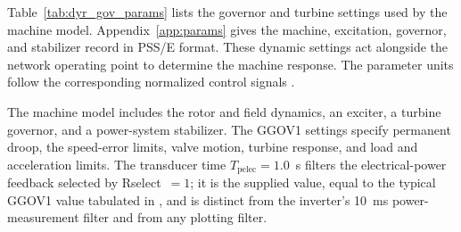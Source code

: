 \documentclass[11pt]{article}
\begin{document}
Table~\ref{tab:dyr_gov_params} lists the governor and turbine settings used by the machine model. Appendix~\ref{app:params} gives the machine, excitation, governor, and stabilizer record in PSS/E format. These dynamic settings act alongside the network operating point to determine the machine response. The parameter units follow the corresponding normalized control signals \cite{pestr1,pssemodels}.

The machine model includes the rotor and field dynamics, an exciter, a turbine governor, and a power-system stabilizer. The GGOV1 settings specify permanent droop, the speed-error limits, valve motion, turbine response, and load and acceleration limits. The transducer time $T_{\mathrm{pelec}}=1.0$~s filters the electrical-power feedback selected by Rselect~$=1$; it is the supplied value, equal to the typical GGOV1 value tabulated in \cite{pestr1}, and is distinct from the inverter's 10~ms power-measurement filter and from any plotting filter. 
\end{document}
